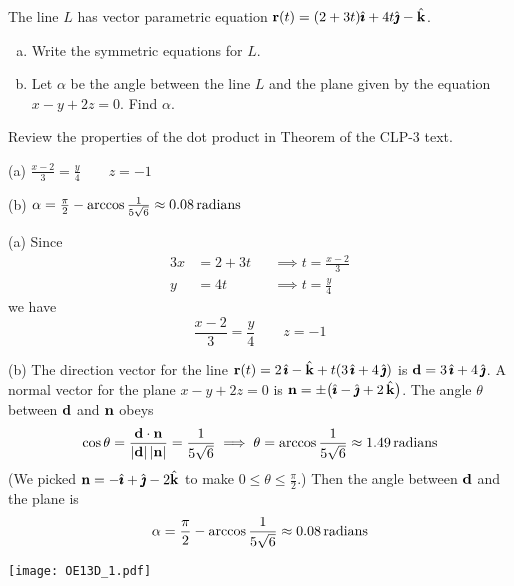 \begin{question}[M200 2013D] %
The line $L$ has vector parametric equation 
$\mathbf{r}(t) = (2 + 3t)\hat{\pmb{\imath}} + 4t\hat{\pmb{\jmath}} - \hat{\mathbf{k}}$.
\begin{enumerate}[(a)]
\item
Write the symmetric equations for $L$.
\item
Let $\alpha$ be the angle between the line $L$ and the plane given 
by the equation $x - y + 2z = 0$. Find $\alpha$.
\end{enumerate}
\end{question}

\begin{hint}
Review the properties of the dot product in 
Theorem  of the CLP-3 text.
\end{hint}

\begin{answer}
(a)  $\frac{x-2}{3}=\frac{y}{4}\qquad z=-1$

(b)  $\alpha =\frac{\pi}{2}-\arccos\frac{1}{5\sqrt{6}}
             \approx 0.08\,\text{radians}$
\end{answer}

\begin{solution}
(a)  Since
\begin{alignat*}{3}
x&=2+3t &&\implies t=\frac{x-2}{3} \\
y&=4t   &&\implies t=\frac{y}{4}
\end{alignat*}
we have
\begin{equation*}
\frac{x-2}{3}=\frac{y}{4}\qquad z=-1
\end{equation*}

(b) The direction vector for the line 
   $\mathbf{r}(t) = 2\,\hat{\pmb{\imath}}-\hat{\mathbf{k}} +t(3\,\hat{\pmb{\imath}}+4\,\hat{\pmb{\jmath}})$
  is $\mathbf{d}=3\,\hat{\pmb{\imath}}+4\,\hat{\pmb{\jmath}}$. A normal vector for the plane $x-y+2z=0$ is 
   $\mathbf{n}=\pm\big(\hat{\pmb{\imath}}-\hat{\pmb{\jmath}}+2\,\hat{\mathbf{k}}\big)$. The angle $\theta$ between $\mathbf{d}$ 
   and $\mathbf{n}$ obeys
\begin{align*}
\cos\theta =\frac{\mathbf{d}\cdot\mathbf{n}}{|\mathbf{d}|\,|\mathbf{n}|}
           =\frac{1}{5\sqrt{6}}
\implies \theta =\arccos\frac{1}{5\sqrt{6}}\approx 1.49\,\text{radians}
\end{align*}
(We picked $\mathbf{n}=-\hat{\pmb{\imath}}+\hat{\pmb{\jmath}}-2\hat{\mathbf{k}}$ to make $0\le\theta\le\frac{\pi}{2}$.)
Then the angle between $\mathbf{d}$ and the plane is
\begin{equation*}
\alpha =\frac{\pi}{2}-\arccos\frac{1}{5\sqrt{6}}\approx 0.08\,\text{radians}
\end{equation*}

\begin{center}
     \texttt{[image: OE13D\_1.pdf]}
\end{center}


\end{solution}

